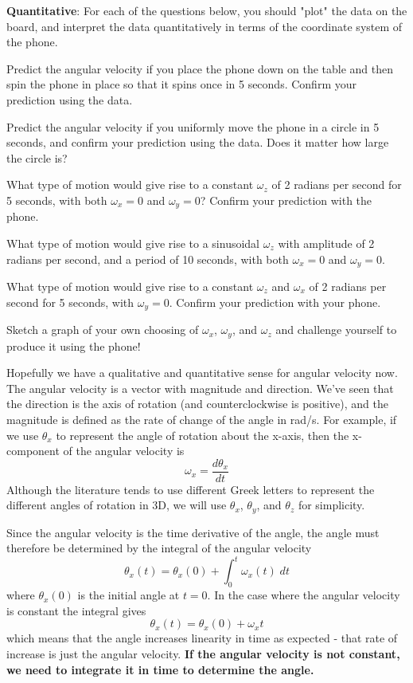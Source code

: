 \documentclass{tufte-handout}
\begin{document}
\be[resume=exercises, label=\textbf{Exercise} (\arabic*)]
\item {\bf Quantitative}: For each of the questions below, you should "plot" the data on the board, and interpret the data quantitatively in terms of the coordinate system of the phone.
\be
\item Predict the angular velocity if you place the phone down on the table and then spin the phone in place so that it spins once in 5 seconds. Confirm your prediction using the data.
\item Predict the angular velocity if you uniformly move the phone in a circle in 5 seconds, and confirm your prediction using the data. Does it matter how large the circle is?
\item What type of motion would give rise to a constant $\omega_z$ of 2 radians per second for 5 seconds, with both $\omega_x = 0$ and $\omega_y = 0$? Confirm your prediction with the phone.
\item What type of motion would give rise to a sinusoidal $\omega_z$ with amplitude of 2 radians per second, and a period of 10 seconds, with both $\omega_x=0$ and $\omega_y=0$.
\item What type of motion would give rise to a constant $\omega_z$ and $\omega_x$ of 2 radians per second for 5 seconds, with $\omega_y=0$. Confirm your prediction with your phone.
\item Sketch a graph of your own choosing of $\omega_x$, $\omega_y$, and $\omega_z$ and challenge yourself to produce it using the phone!
\ee
\ee

Hopefully we have a qualitative and quantitative sense for angular velocity now.  The angular velocity is a vector with magnitude and direction. We've seen that the direction is the axis of rotation (and counterclockwise is positive), and the magnitude is defined as the rate of change of the angle in rad/s. For example, if we use $\theta_x$ to represent the angle of rotation about the x-axis, then the x-component of the angular velocity is
\[ \omega_x = \frac{d \theta_x}{dt} \]
Although the literature tends to use different Greek letters to represent the different angles of rotation in 3D, we will use $\theta_x$, $\theta_y$, and $\theta_z$ for simplicity.

Since the angular velocity is the time derivative of the angle, the angle must therefore be determined by the integral of the angular velocity
\[ \theta_x(t) = \theta_x(0) + \int_0^t \omega_x(t) \; dt \]
where $\theta_x(0)$ is the initial angle at $t=0$. In the case where the angular velocity is constant the integral gives
\[ \theta_x(t) = \theta_x(0) + \omega_x t \]
which means that the angle increases linearity in time as expected - that rate of increase is just the angular velocity. {\bf If the angular velocity is not constant, we need to integrate it in time to determine the angle.}
\end{document}
